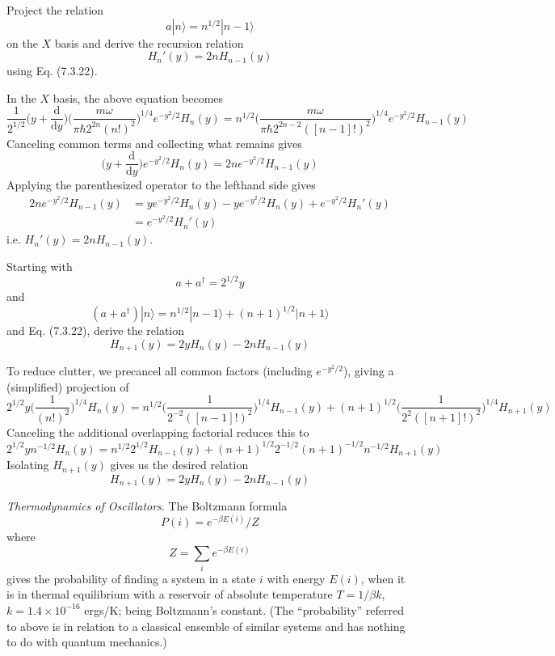 \documentclass[../principles-of-quantum-mechanics.tex]{subfiles}
\begin{document}
\begin{questions}
		\question Project the relation
		$$a|n\rangle = n^{1/2}|n - 1\rangle$$
		on the $X$ basis and derive the recursion relation
		$$H_n'(y) = 2nH_{n-1}(y)$$
		using Eq. (7.3.22).
		\begin{solution}
			In the $X$ basis, the above equation becomes
			$$\frac{1}{2^{1/2}}\Big(y + \frac{\mathrm{d}}{\mathrm{d}y}\Big)\Big(\frac{m\omega}{\pi\hbar 2^{2n}(n!)^2}\Big)^{1/4}e^{-y^2/2}H_n(y) = n^{1/2}\Big(\frac{m\omega}{\pi\hbar 2^{2n - 2}([n-1]!)^2}\Big)^{1/4}e^{-y^2/2}H_{n-1}(y)$$
			Canceling common terms and collecting what remains gives
			$$\Big(y + \frac{\mathrm{d}}{\mathrm{d}y}\Big)e^{-y^2/2}H_n(y) = 2ne^{-y^2/2}H_{n-1}(y)$$
			Applying the parenthesized operator to the lefthand side gives
			\begin{align*}
				2ne^{-y^2/2}H_{n-1}(y) &= ye^{-y^2/2}H_n(y) - ye^{-y^2/2}H_n(y) + e^{-y^2/2}H_n'(y) \\
				&= e^{-y^2/2}H_n'(y)
			\end{align*}
			i.e. $H_n'(y) = 2nH_{n-1}(y)$.
		\end{solution}
		
		\question Starting with
		$$a + a^\dagger = 2^{1/2}y$$
		and
		$$(a + a^\dagger)|n\rangle = n^{1/2}|n - 1\rangle + (n + 1)^{1/2}|n + 1\rangle$$
		and Eq. (7.3.22), derive the relation
		$$H_{n+1}(y) = 2yH_n(y) - 2nH_{n-1}(y)$$
		\begin{solution}
			To reduce clutter, we precancel all common factors (including $e^{-y^2/2}$), giving a (simplified) projection of
			$$2^{1/2}y\Big(\frac{1}{(n!)^2}\Big)^{1/4}H_n(y) = n^{1/2}\Big(\frac{1}{2^{-2}([n-1]!)^2}\Big)^{1/4}H_{n-1}(y) + (n+1)^{1/2}\Big(\frac{1}{2^{2}([n+1]!)^2}\Big)^{1/4}H_{n+1}(y)$$
			Canceling the additional overlapping factorial reduces this to
			$$2^{1/2}yn^{-1/2}H_n(y) = n^{1/2}2^{1/2}H_{n-1}(y) + (n+1)^{1/2}2^{-1/2}(n+1)^{-1/2}n^{-1/2}H_{n+1}(y)$$
			Isolating $H_{n+1}(y)$ gives us the desired relation
			$$H_{n+1}(y) = 2yH_n(y) - 2nH_{n-1}(y)$$
		\end{solution}
		
		\question \textit{Thermodynamics of Oscillators}. The Boltzmann formula
		$$P(i) = e^{-\beta E(i)}/Z$$
		where
		$$Z = \sum_i e^{-\beta E(i)}$$
		gives the probability of finding a system in a state $i$ with energy $E(i)$, when it is in thermal equilibrium with a reservoir of absolute temperature $T = 1/\beta k$, $k = 1.4\times 10^{-16}$ ergs/K; being Boltzmann's constant. (The ``probability'' referred to above is in relation to a classical ensemble of similar systems and has nothing to do with quantum mechanics.)
		

\end{questions}
\end{document}
